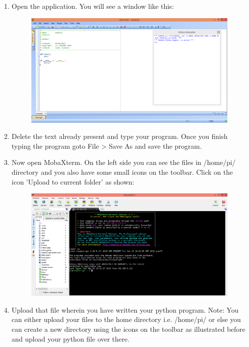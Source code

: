 \documentclass[11pt,a4paper]{report}
\begin{document}
\begin{flushleft}
\begin{enumerate}
\begin{itemize}
\begin{enumerate}
				\item Open the application. You will see a window like this:
				\begin{figure}[h!]
					\includegraphics[scale=0.4]{py.png}
					\centering
					\caption{}
				\end{figure}
				\item Delete the text already present and type your program. Once you finish typing the program goto File > Save As and save the program.
				\item Now open MobaXterm. On the left side you can see the files in /home/pi/ directory and you also have some small icons on the toolbar. Click on the icon 'Upload to current folder' as shown:
				\begin{figure}[h!]
					\includegraphics[scale=0.4]{1.png}
					\centering
					\caption{}
				\end{figure}
				\newpage
				\item Upload that file wherein you have written your python program.
				Note: You can either upload your files to the home directory i.e. /home/pi/ or else you can create a new directory using the icons on the toolbar as illustrated before and upload your python file over there.

\end{enumerate}
\end{itemize}
\end{enumerate}
\end{flushleft}
\end{document}
